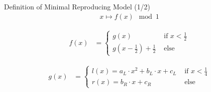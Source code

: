 \begin{frame}{Definition of Minimal Reproducing Model (1/2)}
    \vspace{-3.0em}
    \begin{align}
        x \mapsto f(x) \mod 1
    \end{align}

    \begin{align}
        f(x) & = \begin{cases}
                     g(x)                                        & \text{ if } x < \frac{1}{2} \\
                     g\left(x - \frac{1}{2}\right) + \frac{1}{2} & \text{ else}
                 \end{cases}
    \end{align}

    \begin{align}
        g(x) & = \begin{cases}
                     l(x) = a_L \cdot x^2 + b_L \cdot x + c_L & \text{ if } x < \frac{1}{4} \\
                     r(x) = b_R \cdot x + c_R                 & \text{ else}
                 \end{cases}
    \end{align}
\end{frame}

